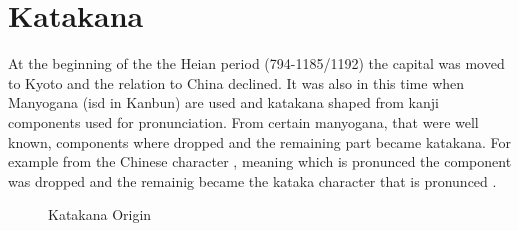 
\section{Katakana}\label{sec:Katakana}


At the beginning of the the Heian period (794-1185/1192) the capital was moved
to Kyoto and the relation to China declined. It was also in this time when
Manyogana (isd in Kanbun) are used and katakana shaped from kanji components
used for pronunciation. From certain manyogana, that were well known,
components where dropped and the remaining part became katakana. For example
from the Chinese character , meaning 
which is pronunced  the  component was dropped and
the remainig  became the kataka character that is pronunced .



\begin{figure}[H]
\begin{center}

\caption{Katakana Origin}
\label{fig:KatakanaOrigin} %
\end{center}
\end{figure}

